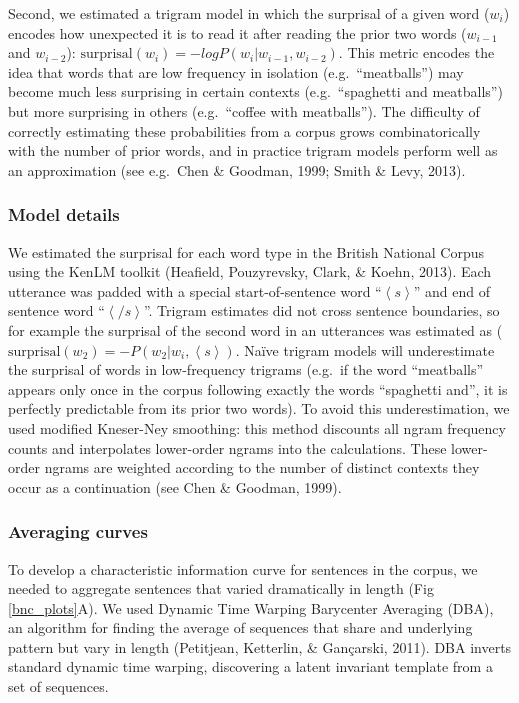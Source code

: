 \documentclass[10pt, letterpaper]{article}
\begin{document}
Second, we estimated a trigram model in which the surprisal of a given
word (\(w_i\)) encodes how unexpected it is to read it after reading the
prior two words (\(w_{i-1}\) and \(w_{i-2}\)):
\(\text{surprisal}(w_{i}) = -log P(w_i|w_{i-1},w_{i-2})\). This metric
encodes the idea that words that are low frequency in isolation
(e.g.~``meatballs'') may become much less surprising in certain contexts
(e.g.~``spaghetti and meatballs'') but more surprising in others
(e.g.~``coffee with meatballs''). The difficulty of correctly estimating
these probabilities from a corpus grows combinatorically with the number
of prior words, and in practice trigram models perform well as an
approximation (see e.g.~Chen \& Goodman, 1999; Smith \& Levy, 2013).

\hypertarget{model-details}{%
\subsubsection{Model details}\label{model-details}}

We estimated the surprisal for each word type in the British National
Corpus using the KenLM toolkit (Heafield, Pouzyrevsky, Clark, \& Koehn,
2013). Each utterance was padded with a special start-of-sentence word
``\(\left<s\right>\)'' and end of sentence word ``\(\left</s\right>\)''.
Trigram estimates did not cross sentence boundaries, so for example the
surprisal of the second word in an utterances was estimated as
(\(\text{surprisal}(w_{2}) = -P(w_2|w_{i},\left<s\right>)\). Naïve
trigram models will underestimate the surprisal of words in
low-frequency trigrams (e.g.~if the word ``meatballs'' appears only once
in the corpus following exactly the words ``spaghetti and'', it is
perfectly predictable from its prior two words). To avoid this
underestimation, we used modified Kneser-Ney smoothing: this method
discounts all ngram frequency counts and interpolates lower-order ngrams
into the calculations. These lower-order ngrams are weighted according
to the number of distinct contexts they occur as a continuation (see
Chen \& Goodman, 1999).

\hypertarget{averaging-curves}{%
\subsubsection{Averaging curves}\label{averaging-curves}}

To develop a characteristic information curve for sentences in the
corpus, we needed to aggregate sentences that varied dramatically in
length (Fig \ref{bnc_plots}A). We used Dynamic Time Warping Barycenter
Averaging (DBA), an algorithm for finding the average of sequences that
share and underlying pattern but vary in length (Petitjean, Ketterlin,
\& Gançarski, 2011). DBA inverts standard dynamic time warping,
discovering a latent invariant template from a set of sequences.
\end{document}
